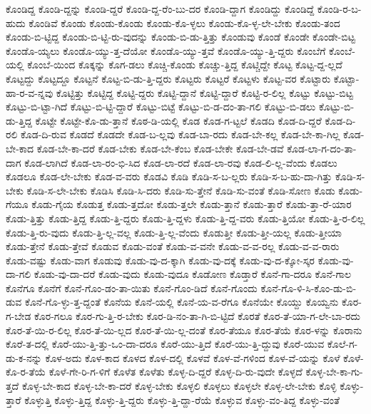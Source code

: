 {ಕೊಂಡಿದ್ದ
ಕೊಂಡಿ-ದ್ದನ್ನು
ಕೊಂಡಿ-ದ್ದರೆ
ಕೊಂಡಿ-ದ್ದ-ರೆಂ-ಬು-ದರ
ಕೊಂಡಿ-ದ್ದಾಗ
ಕೊಂಡಿದ್ದು
ಕೊಂಡಿದ್ದೆ
ಕೊಂಡಿ-ರ-ಬ-ಹುದು
ಕೊಂಡಿವೆ
ಕೊಂಡು
ಕೊಂಡು-ಕೊಂಡು
ಕೊಂಡು-ಕೊ-ಳ್ಳಲು
ಕೊಂಡು-ಕೊ-ಳ್ಳ-ಲೇ-ಬೇಕು
ಕೊಂಡು-ತಂದ
ಕೊಂಡು-ಬಿ-ಟ್ಟಿದ್ದ
ಕೊಂಡು-ಬಿ-ಟ್ಟಿ-ರು-ವುದನ್ನು
ಕೊಂಡು-ಬಿ-ಡು-ತ್ತಿತ್ತು
ಕೊಂಡುವು
ಕೊಂಡೆ
ಕೊಂಡೇ
ಕೊಂಡೇ-ಬಿಟ್ಟ
ಕೊಂಡೊ-ಯ್ಯಲು
ಕೊಂಡೊ-ಯ್ಯು-ತ್ತ-ದೆಯೋ
ಕೊಂಡೊ-ಯ್ಯು-ತ್ತವೆ
ಕೊಂಡೊ-ಯ್ಯು-ತ್ತಿ-ದ್ದರು
ಕೊಂಬೆಗೆ
ಕೊಂಬೆ-ಯಲ್ಲಿ
ಕೊಂಬೆ-ಯಿಂದ
ಕೊಕ್ಕನ್ನು
ಕೊಗ-ಡಲು
ಕೊಚ್ಚಿ-ಕೊಂಡು
ಕೊಚ್ಚು-ತ್ತಿದ್ದ
ಕೊಟ್ಚಿದ್ದೇ
ಕೊಟ್ಟ
ಕೊಟ್ಟ-ದ್ದ-ಲ್ಲದೆ
ಕೊಟ್ಟದ್ದು
ಕೊಟ್ಟದ್ದೂ
ಕೊಟ್ಟನೆ
ಕೊಟ್ಟ-ಬಿ-ಡು-ತ್ತಿ-ದ್ದರು
ಕೊಟ್ಟರು
ಕೊಟ್ಟರೆ
ಕೊಟ್ಟಳು
ಕೊಟ್ಟ-ವರ
ಕೊಟ್ಟಾರು
ಕೊಟ್ಟಾ-ಹಾ-ರ-ವ-ನ್ನವು
ಕೊಟ್ಟಿತ್ತು
ಕೊಟ್ಟಿದ್ದ
ಕೊಟ್ಟಿ-ದ್ದರು
ಕೊಟ್ಟಿ-ದ್ದಾನೆ
ಕೊಟ್ಟಿ-ದ್ದಾರೆ
ಕೊಟ್ಟಿ-ರ-ಲಿಲ್ಲ
ಕೊಟ್ಟು
ಕೊಟ್ಟು-ಬಿಟ್ಟ
ಕೊಟ್ಟು-ಬಿ-ಟ್ಟಾ-ಗಿದೆ
ಕೊಟ್ಟು-ಬಿ-ಟ್ಟಿ-ದ್ದಾರೆ
ಕೊಟ್ಟು-ಬಿಟ್ಟೆ
ಕೊಟ್ಟು-ಬಿ-ಡ-ದಂ-ತಾ-ಗಲಿ
ಕೊಟ್ಟು-ಬಿ-ಡಲು
ಕೊಟ್ಟು-ಬಿ-ಡು-ತ್ತಿದ್ದ
ಕೊಟ್ಟೇ
ಕೊಟ್ಟೇ-ಕೊ-ಡು-ತ್ತಾನೆ
ಕೊಠ-ಡಿ-ಯಲ್ಲಿ
ಕೊಡ
ಕೊಡ-ಗ-ಟ್ಟಲೆ
ಕೊಡದಿ
ಕೊಡ-ದಿ-ದ್ದರೆ
ಕೊಡ-ದಿ-ರಲಿ
ಕೊಡ-ದಿ-ರುವ
ಕೊಡದೆ
ಕೊಡದೇ
ಕೊಡ-ಬ-ಲ್ಲವು
ಕೊಡ-ಬಾ-ರದು
ಕೊಡ-ಬೇ-ಕಲ್ಲ
ಕೊಡ-ಬೇ-ಕಾ-ಗಿಲ್ಲ
ಕೊಡ-ಬೇ-ಕಾದ
ಕೊಡ-ಬೇ-ಕಾ-ದರೆ
ಕೊಡ-ಬೇಕು
ಕೊಡ-ಬೇ-ಕೆಂಬ
ಕೊಡ-ಬೇಕೇ
ಕೊಡ-ಬೇ-ಡವೆ
ಕೊಡ-ಲಾ-ಗ-ದಂ-ತಾ-ದಾಗ
ಕೊಡ-ಲಾಗಿದೆ
ಕೊಡ-ಲಾ-ರಂ-ಭಿ-ಸಿದ
ಕೊಡ-ಲಾ-ರದೆ
ಕೊಡ-ಲಾ-ರವು
ಕೊಡ-ಲಿ-ಲ್ಲ-ವೆಂದು
ಕೊಡಲು
ಕೊಡಲೂ
ಕೊಡ-ಲೇ-ಬೇಕು
ಕೊಡ-ವ-ವರು
ಕೊಡವಿ
ಕೊಡಿ
ಕೊಡಿ-ಸ-ಬ-ಲ್ಲರು
ಕೊಡಿ-ಸ-ಬ-ಹು-ದಾ-ಗಿತ್ತು
ಕೊಡಿ-ಸ-ಬೇಕು
ಕೊಡಿ-ಸ-ಲೇ-ಬೇಕು
ಕೊಡಿಸಿ
ಕೊಡಿ-ಸಿ-ದರು
ಕೊಡಿ-ಸು-ತ್ತೇನೆ
ಕೊಡಿ-ಸು-ವಂತೆ
ಕೊಡಿ-ಸೋಣ
ಕೊಡು
ಕೊಡು-ಗೆಯೂ
ಕೊಡು-ಗೈಯ
ಕೊಡುತ್ತ
ಕೊಡು-ತ್ತದೋ
ಕೊಡು-ತ್ತಲೇ
ಕೊಡು-ತ್ತಾನೆ
ಕೊಡು-ತ್ತಾರೆ
ಕೊಡು-ತ್ತಾ-ರೆ-ಯಾರ
ಕೊಡು-ತ್ತಿತ್ತು
ಕೊಡು-ತ್ತಿದ್ದ
ಕೊಡು-ತ್ತಿ-ದ್ದರು
ಕೊಡು-ತ್ತಿ-ದ್ದಳು
ಕೊಡು-ತ್ತಿ-ದ್ದ-ವರು
ಕೊಡು-ತ್ತಿಯೋ
ಕೊಡು-ತ್ತಿ-ರ-ಲಿಲ್ಲ
ಕೊಡು-ತ್ತಿ-ರು-ವುದು
ಕೊಡು-ತ್ತಿ-ಲ್ಲ-ವಲ್ಲ
ಕೊಡು-ತ್ತಿ-ಲ್ಲ-ವೆಂದು
ಕೊಡುತ್ತೀ
ಕೊಡು-ತ್ತೀ-ಯಲ್ಲ
ಕೊಡು-ತ್ತೀಯಾ
ಕೊಡು-ತ್ತೇನೆ
ಕೊಡು-ತ್ತೇವೆ
ಕೊಡುವ
ಕೊಡು-ವಂತೆ
ಕೊಡು-ವ-ವನೇ
ಕೊಡು-ವ-ವ-ರಲ್ಲ
ಕೊಡು-ವ-ವ-ರಾರು
ಕೊಡು-ವಷ್ಟು
ಕೊಡು-ವಾಗ
ಕೊಡುವು
ಕೊಡು-ವು-ದ-ಕ್ಕಾಗಿ
ಕೊಡು-ವು-ದಕ್ಕೆ
ಕೊಡು-ವು-ದ-ಕ್ಕೋ-ಸ್ಕರ
ಕೊಡು-ವು-ದಾ-ಗಲಿ
ಕೊಡು-ವು-ದಾ-ದರೆ
ಕೊಡು-ವುದು
ಕೊಡು-ವುದೂ
ಕೊಡೋಣ
ಕೊಡ್ತಾರೆ
ಕೊನೆ-ಗಾ-ದರೂ
ಕೊನೆ-ಗಾಲ
ಕೊನೆಗೂ
ಕೊನೆಗೆ
ಕೊನೆ-ಗೊಂ-ಡಂ-ತಾ-ಯಿತು
ಕೊನೆ-ಗೊಂ-ಡಿದೆ
ಕೊನೆ-ಗೊಂದು
ಕೊನೆ-ಗೊ-ಳಿ-ಸಿ-ಕೊಂ-ಡು-ಬಿ-ಡುವ
ಕೊನೆ-ಗೊ-ಳ್ಳು-ತ್ತ-ದ್ದಂತೆ
ಕೊನೆಯ
ಕೊನೆ-ಯಲ್ಲಿ
ಕೊನೆ-ಯ-ವ-ರೆಗೂ
ಕೊನೆಯೇ
ಕೊಯ್ದು
ಕೊಯ್ವನು
ಕೊರ-ಗ-ಬೇಡ
ಕೊರ-ಗಲೂ
ಕೊರ-ಗು-ತ್ತಿ-ರ-ಬೇಕು
ಕೊರ-ಡಿ-ನಂ-ತಾ-ಗಿ-ಬಿ-ಟ್ಟಿದೆ
ಕೊರತೆ
ಕೊರ-ತೆ-ಯಾ-ಗ-ಲೇ-ಬಾ-ರದು
ಕೊರ-ತೆ-ಯಿ-ರ-ಲಿಲ್ಲ
ಕೊರ-ತೆ-ಯಿ-ಲ್ಲದ
ಕೊರ-ತೆ-ಯಿ-ಲ್ಲ-ದಂತೆ
ಕೊರ-ತೆಯೂ
ಕೊರ-ತೆಯೆ
ಕೊರ-ಳನ್ನು
ಕೊರಾನು
ಕೊರೆ-ತ-ದಲ್ಲಿ
ಕೊರೆ-ಯು-ತ್ತಿ-ತ್ತು-ಒಂ-ದಾ-ದರೂ
ಕೊರೆ-ಯು-ತ್ತಿದೆ
ಕೊರೆ-ಯು-ತ್ತಿ-ದ್ದುವು
ಕೊರೆ-ಯುವ
ಕೊಲೆ-ಗ-ಡು-ಕ-ನನ್ನು
ಕೊಳ-ಅದು
ಕೊಳ-ಕಾದ
ಕೊಳದ
ಕೊಳ-ದಲ್ಲಿ
ಕೊಳವೆ
ಕೊಳ-ವೆ-ಗಳಿಂದ
ಕೊಳ-ವೆ-ಯನ್ನು
ಕೊಳೆ
ಕೊಳೆ-ಕೊ-ರ-ತೆಯೆ
ಕೊಳೆ-ಗೇ-ರಿ-ಗ-ಳಿಗೆ
ಕೊಳೆತ
ಕೊಳೆತು
ಕೊಳ್ಳ-ದಿ-ದ್ದರೆ
ಕೊಳ್ಳ-ದಿ-ರು-ವುದೇ
ಕೊಳ್ಳದೆ
ಕೊಳ್ಳ-ಬೇ-ಕಾ-ಗು-ತ್ತದೆ
ಕೊಳ್ಳ-ಬೇ-ಕಾದ
ಕೊಳ್ಳ-ಬೇ-ಕಾ-ದರೆ
ಕೊಳ್ಳ-ಬೇಕು
ಕೊಳ್ಳಲಿ
ಕೊಳ್ಳಲು
ಕೊಳ್ಳಲೇ
ಕೊಳ್ಳ-ಲೇ-ಬೇಕು
ಕೊಳ್ಳಿ
ಕೊಳ್ಳು-ತ್ತಾರೆ
ಕೊಳ್ಳುತ್ತಿ
ಕೊಳ್ಳು-ತ್ತಿದ್ದ
ಕೊಳ್ಳು-ತ್ತಿ-ದ್ದರು
ಕೊಳ್ಳು-ತ್ತಿ-ದ್ದಾ-ರೆಯೆ
ಕೊಳ್ಳುವ
ಕೊಳ್ಳು-ವಂ-ತಿದ್ದ
ಕೊಳ್ಳು-ವಂತೆ
}
